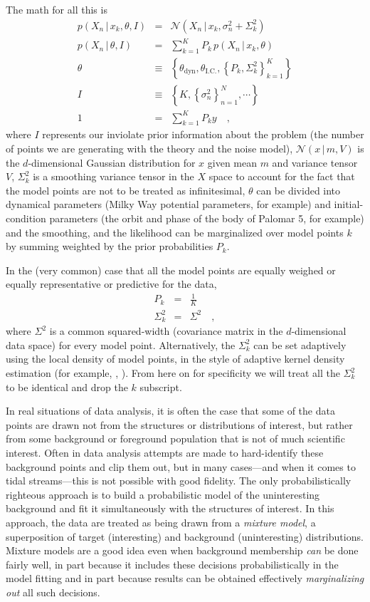 \documentclass[12pt,pdftex,preprint]{aastex}
\newcommand{\setof}[1]{\left\{{#1}\right\}}
\newcommand{\given}{\,|\,}
\newcommand{\dyn}{\mathrm{dyn}}
\newcommand{\ic}{\mathrm{I.C.}}
\newcommand{\normal}{\mathscr{N}}
\begin{document}
The math for all this is
\begin{eqnarray}
p(X_n\given x_k,\theta,I) &=& \normal(X_n\given x_k,\sigma^2_n+\Sigma_k^2)
\\
p(X_n\given\theta,I) &=& \sum_{k=1}^K P_k\,p(X_n\given x_k,\theta)
\\
\theta &\equiv& \setof{\theta_\dyn, \theta_\ic, \setof{P_k, \Sigma_k^2}_{k=1}^K }
\\
I &\equiv& \setof{K, \setof{\sigma^2_n}_{n=1}^N, \cdots}
\\
1 &=& \sum_{k=1}^K P_ky
\quad ,
\end{eqnarray}
where $I$ represents our inviolate prior information about the problem
(the number of points we are generating with the theory and the noise
model), $\normal(x\given m, V)$ is the $d$-dimensional Gaussian
distribution for $x$ given mean $m$ and variance tensor $V$,
$\Sigma^2_k$ is a smoothing variance tensor in the $X$ space to
account for the fact that the model points are not to be treated as
infinitesimal, $\theta$ can be divided into dynamical parameters
(Milky Way potential parameters, for example) and initial-condition
parameters (the orbit and phase of the body of Palomar 5, for example)
and the smoothing, and the likelihood can be marginalized over model
points $k$ by summing weighted by the prior probabilities $P_k$.

In the (very common) case that all the model points are
equally weighed or equally representative or predictive for the data,
\begin{eqnarray}
P_k &=& \frac{1}{K}
\\
\Sigma^2_k &=& \Sigma^2
\quad ,
\end{eqnarray}
where $\Sigma^2$ is a common squared-width (covariance matrix in the
$d$-dimensional data space) for every model point.  Alternatively, the
$\Sigma^2_k$ can be set adaptively using the local density of model
points, in the style of adaptive kernel density estimation (for
example, \citealt{adaptiveKDE1}, \citealt{adaptiveKDE2}).  From here
on for specificity we will treat all the $\Sigma^2_k$ to be identical
and drop the $k$ subscript.

In real situations of data analysis, it is often the case that some of
the data points are drawn not from the structures or distributions of
interest, but rather from some background or foreground population
that is not of much scientific interest.  Often in data analysis
attempts are made to hard-identify these background points and clip
them out, but in many cases---and when it comes to tidal
streams---this is not possible with good fidelity.  The only
probabilistically righteous approach is to build a probabilistic model
of the uninteresting background and fit it simultaneously with the
structures of interest.  In this approach, the data are treated as
being drawn from a \emph{mixture model}, a superposition of target
(interesting) and background (uninteresting) distributions.  Mixture
models are a good idea even when background membership \emph{can} be
done fairly well, in part because it includes these decisions
probabilistically in the model fitting and in part because results can
be obtained effectively \emph{marginalizing out} all such decisions.
\end{document}
